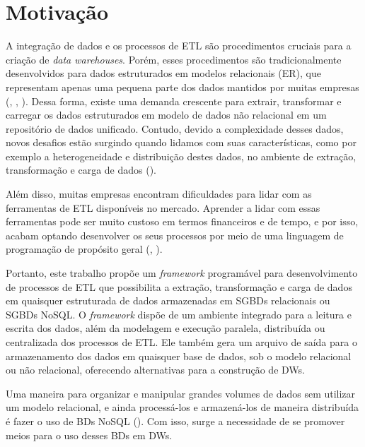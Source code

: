 %

\section{Motivação}

A integração de dados e os processos de ETL são procedimentos cruciais para a criação de \textit{data warehouses}. Porém, esses procedimentos são tradicionalmente desenvolvidos para dados estruturados em modelos relacionais (ER), que representam apenas uma pequena parte dos dados mantidos por muitas empresas (\cite{darmont:2005}, \cite{russom:2007}, \cite{thomsen:2009}). Dessa forma, existe uma demanda crescente para extrair, transformar e carregar os dados estruturados em modelo de dados não relacional em um repositório de dados unificado. Contudo, devido a complexidade desses dados, novos desafios estão surgindo quando lidamos com suas características, como por exemplo a heterogeneidade e distribuição destes dados, no ambiente de extração, transformação e carga de dados (\cite{salem:2012}).

Além disso, muitas empresas encontram dificuldades para lidar com as ferramentas de ETL disponíveis no mercado. Aprender a lidar com essas ferramentas pode ser muito custoso em termos financeiros e de tempo, e por isso, acabam optando desenvolver os seus processos por meio de uma linguagem de programação de propósito geral (\cite{awad:2011}, \cite{munoz:2009}).

Portanto, este trabalho propõe um \textit{framework} programável para desenvolvimento de processos de ETL que possibilita a extração, transformação e carga de dados em quaisquer estruturada de dados armazenadas em SGBDs relacionais ou SGBDs NoSQL. O \textit{framework} dispõe de um ambiente integrado para a leitura e escrita dos dados, além da modelagem e execução paralela, distribuída ou centralizada dos processos de ETL. Ele também gera um arquivo de saída para o armazenamento dos dados em quaisquer base de dados, sob o modelo relacional ou não relacional, oferecendo alternativas para a construção de DWs.

Uma maneira para organizar e manipular grandes volumes de dados sem utilizar um modelo relacional, e ainda processá-los e armazená-los de maneira distribuída é fazer o uso de BDs NoSQL (\cite{scabora:2016}). Com isso, surge a necessidade de se promover meios para o uso desses BDs em DWs. 

